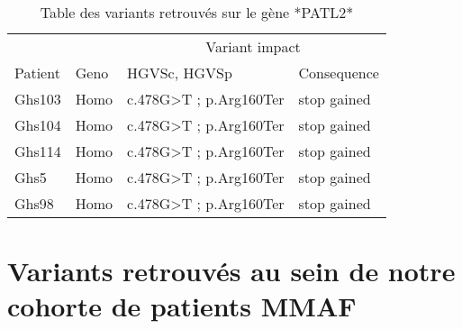 \documentclass[12pt,twoside]{ugathesis}
\begin{document}
\begin{longtable}[t]{llll}
\caption{\label{tab:tabpatl2}Table des variants retrouvés sur le gène *PATL2*}\\
\toprule
\multicolumn{2}{c}{ } & \multicolumn{2}{c}{Variant impact} \\
\cmidrule(l{2pt}r{2pt}){3-4}
Patient & Geno & HGVSc, HGVSp & Consequence\\
\midrule
Ghs103 & Homo & c.478G>T ; p.Arg160Ter & stop gained\\
Ghs104 & Homo & c.478G>T ; p.Arg160Ter & stop gained\\
Ghs114 & Homo & c.478G>T ; p.Arg160Ter & stop gained\\
Ghs5 & Homo & c.478G>T ; p.Arg160Ter & stop gained\\
Ghs98 & Homo & c.478G>T ; p.Arg160Ter & stop gained\\
\bottomrule
\end{longtable}

\newpage

\chapter{Variants retrouvés au sein de notre cohorte de patients
MMAF}\label{variants-retrouves-au-sein-de-notre-cohorte-de-patients-mmaf}

\newpage
\end{document}
